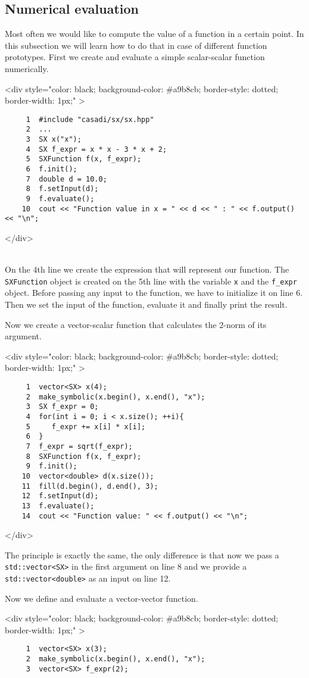 \documentclass[a4paper,12pt]{book}
\newcommand{\codebegin}{
\begin{rawhtml}
<div style="color: black; background-color: \#a9b8cb;  border-style: dotted; border-width: 1px;" >
\end{rawhtml}
}
\newcommand{\codeend}{
\begin{rawhtml}
</div>
\end{rawhtml}
}
\begin{document}
{\subsection*{Numerical evaluation}
Most often we would like to compute the value of a function in a certain point. In this subsection we will learn how to do that
 in case of different function prototypes.
First we create and evaluate a simple scalar-scalar function numerically.
\par
\codebegin
\begin{verbatim}
     1  #include "casadi/sx/sx.hpp"
     2  ...
     3  SX x("x");
     4  SX f_expr = x * x - 3 * x + 2;
     5  SXFunction f(x, f_expr);
     6  f.init();
     7  double d = 10.0;
     8  f.setInput(d);
     9  f.evaluate();
    10  cout << "Function value in x = " << d << " : " << f.output() << "\n";
\end{verbatim}
\codeend\\
On the 4th line we create the expression that will represent our function. The \texttt{SXFunction}
object is created on the 5th line with the variable \texttt{x} and the \texttt{f\_expr} object.
Before passing any input to the function, we have to initialize it on line 6. Then we set the input
of the function, evaluate it and finally print the result.
\par\noindent
Now we create a vector-scalar function that calculates the 2-norm of its argument.
\par
\codebegin
\begin{verbatim}
     1  vector<SX> x(4);
     2  make_symbolic(x.begin(), x.end(), "x");
     3  SX f_expr = 0;
     4  for(int i = 0; i < x.size(); ++i){
     5     f_expr += x[i] * x[i];
     6  }
     7  f_expr = sqrt(f_expr);
     8  SXFunction f(x, f_expr);
     9  f.init();
    10  vector<double> d(x.size());
    11  fill(d.begin(), d.end(), 3);
    12  f.setInput(d);
    13  f.evaluate();
    14  cout << "Function value: " << f.output() << "\n";
\end{verbatim}
\codeend
The principle is exactly the same, the only difference is that now we pass a \texttt{std::vector<SX>} in the first argument
on line 8 and we provide a \texttt{std::vector<double>} as an input on line 12.
\par\noindent
Now we define and evaluate a vector-vector function.
\par 
\codebegin
\begin{verbatim}
     1  vector<SX> x(3);
     2  make_symbolic(x.begin(), x.end(), "x");
     3  vector<SX> f_expr(2);

\end{verbatim}}
\end{document}
